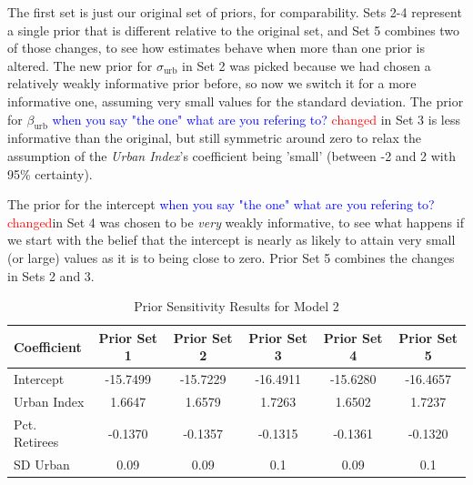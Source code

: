 \documentclass[12pt]{article}
\newcommand{\red}[1]{\textcolor{red}{#1}}
\newcommand{\blue}[1]{\textcolor{blue}{#1}}
\begin{document}
The first set is just our original set of priors, for comparability. Sets 2-4 represent a single prior that is different relative to the original set, and Set 5 combines two of those changes, to see how estimates behave when more than one prior is altered.
The new prior for \(\sigma_\text{urb}\) in Set 2 was picked because we had chosen a relatively weakly informative prior before, so now we switch it for a more informative one, assuming very small values for the standard deviation. 
The prior for \(\beta_\text{urb}\) \blue{ when you say "the one" what are you refering to?} \red{changed} in Set 3 is less informative than the original, but still symmetric around zero to relax the assumption of the \textit{Urban Index}'s coefficient being 'small' (between -2 and 2 with 95\% certainty). 

The prior for the intercept \blue{ when you say "the one" what are you refering to?} \red{changed}in Set 4 was chosen to be \textit{very} weakly informative, to see what happens if we start with the belief that the intercept is nearly as likely to attain very small (or large) values as it is to being close to zero.
Prior Set 5 combines the changes in Sets 2 and 3.

\begin{table}[h]
    \centering
    \begin{tabular}{l|ccccc}
        \hline
        Coefficient    & Prior Set 1 & Prior Set 2 & Prior Set 3 & Prior Set 4 & Prior Set 5 \\
        \hline
        Intercept      & -15.7499 & -15.7229 & -16.4911 & -15.6280 & -16.4657 \\
        Urban Index    & 1.6647 & 1.6579 & 1.7263 & 1.6502 & 1.7237 \\
        Pct. Retirees  & -0.1370 & -0.1357 & -0.1315 & -0.1361 & -0.1320 \\
        SD Urban       & 0.09    & 0.09    & 0.1     & 0.09    & 0.1     \\
        \hline
    \end{tabular}
    \caption{Prior Sensitivity Results for Model 2}
    \label{tab:Prior Sensitivity Results for Model 2}
\end{table}
\end{document}
